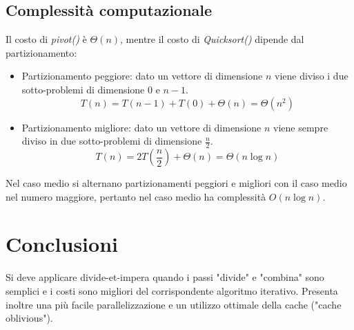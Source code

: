 \subsection{Complessit\`a computazionale}
Il costo di \emph{pivot()} \`e $\Theta(n)$, mentre il costo di \emph{Quicksort()} dipende dal partizionamento:
\begin{itemize}
\item Partizionamento peggiore: dato un vettore di dimensione $n$ viene diviso i due sotto-problemi di dimensione $0$ e $n-1$. $$T(n) = T(n-1) + T(0) + 
\Theta(n) = \Theta(n^2)$$
\item Partizionamento migliore: dato un vettore di dimensione $n$ viene sempre diviso in due sotto-problemi di dimensione $\frac{n}{2}$.  $$T(n) = 
2T(\frac{n}{2}) + \Theta(n) = \Theta(n\log n)$$
\end{itemize}
Nel caso medio si alternano partizionamenti peggiori e migliori con il caso medio nel numero maggiore, pertanto nel caso medio ha complessit\`a $O(n\log n)
$.
\section{Conclusioni}
Si deve applicare divide-et-impera quando i passi "divide" e "combina" sono semplici e i costi sono migliori del corrispondente algoritmo iterativo. Presenta inoltre una pi\`u facile parallelizzazione e un utilizzo
ottimale della cache ("cache oblivious"). 